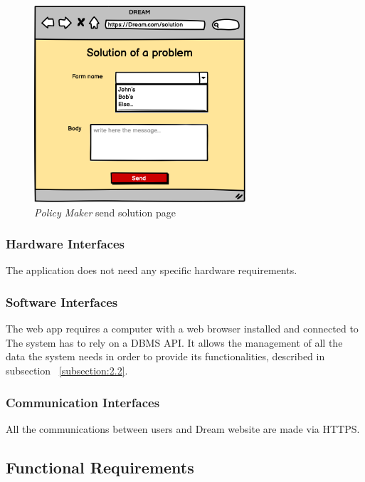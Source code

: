 \begin{figure}[H]
    \begin{center}
    \includegraphics[width=0.7\textwidth]{mocups/Solution.png}
    \caption{\emph{Policy Maker} send solution page}
    \label{fig:PMsolution}
    \end{center}
\end{figure}

\subsubsection{Hardware Interfaces}
The application does not need any specific hardware requirements. 

\subsubsection{Software Interfaces}
The web app requires a computer with a web browser installed and connected to 
The system has to rely on a DBMS API. It allows the management of all the data the system 
needs in order to provide its functionalities, described in subsection ~\ref{subsection:2.2}.

\subsubsection{Communication Interfaces}
All the communications between users and Dream website are made via HTTPS.

\newpage

\subsection{Functional Requirements}

